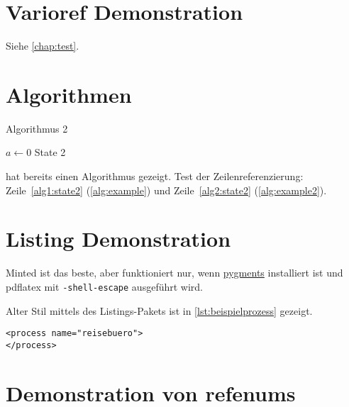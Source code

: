 \documentclass[paper=a5,twoside,fontsize=10pt, DIV=calc, headings=small, bibliography=totoc, listof=totoc]{scrbook}
\begin{document}

\section{Varioref Demonstration}
Siehe \vref{chap:test}.

\section{Algorithmen}
\begin{algorithm}
\caption{Algorithmus 2}
\label{alg:example2}
\begin{algorithmic}[1]
\State $a \gets 0$
\State State 2\label{alg2:state2}
\end{algorithmic}
\end{algorithm}

 hat bereits einen Algorithmus gezeigt.
Test der Zeilenreferenzierung: Zeile~\ref{alg1:state2} (\cref{alg:example}) und Zeile~\ref{alg2:state2} (\cref{alg:example2}).

\section{Listing Demonstration}
Minted ist das beste, aber funktioniert nur, wenn \href{http://pygments.org/download/}{pygments} installiert ist und pdflatex mit \texttt{-shell-escape} ausgeführt wird.

\iffalse
\begin{listing}
\begin{verbatim}
<process name="reisebuero">
</process>
\end{verbatim}
\caption{Beispielprozess}
\label{lst:beispielprozess}
\end{listing}
\fi

Alter Stil mittels des Listings-Pakets ist in \cref{lst:beispielprozess} gezeigt.
\begin{lstlisting}[float,caption={Beispielprozess},label={lst:beispielprozess}]
<process name="reisebuero">
</process>
\end{lstlisting}

\section{Demonstration von refenums}
\label{sec:method}
\end{document}
